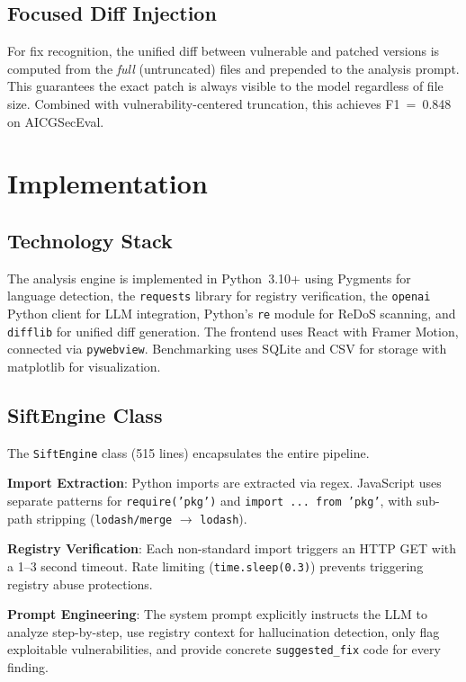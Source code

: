 \documentclass[conference]{IEEEtran}
\begin{document}
\subsection{Focused Diff Injection}

For fix recognition, the unified diff between vulnerable and patched versions is computed from the \textit{full} (untruncated) files and prepended to the analysis prompt. This guarantees the exact patch is always visible to the model regardless of file size. Combined with vulnerability-centered truncation, this achieves F1~=~0.848 on AICGSecEval.

\section{Implementation}

\subsection{Technology Stack}

The analysis engine is implemented in Python~3.10+ using Pygments for language detection, the \texttt{requests} library for registry verification, the \texttt{openai} Python client for LLM integration, Python's \texttt{re} module for ReDoS scanning, and \texttt{difflib} for unified diff generation. The frontend uses React with Framer Motion, connected via \texttt{pywebview}. Benchmarking uses SQLite and CSV for storage with matplotlib for visualization.

\subsection{SiftEngine Class}

The \texttt{SiftEngine} class (515 lines) encapsulates the entire pipeline.

\textbf{Import Extraction}: Python imports are extracted via regex. JavaScript uses separate patterns for \texttt{require('pkg')} and \texttt{import ... from 'pkg'}, with sub-path stripping (\texttt{lodash/merge} $\rightarrow$ \texttt{lodash}).

\textbf{Registry Verification}: Each non-standard import triggers an HTTP GET with a 1--3 second timeout. Rate limiting (\texttt{time.sleep(0.3)}) prevents triggering registry abuse protections.

\textbf{Prompt Engineering}: The system prompt explicitly instructs the LLM to analyze step-by-step, use registry context for hallucination detection, only flag exploitable vulnerabilities, and provide concrete \texttt{suggested\_fix} code for every finding.
\end{document}
